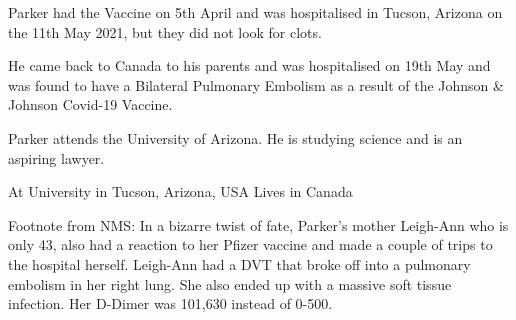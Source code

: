 Parker had the Vaccine on 5th April and was hospitalised in Tucson, Arizona on
the 11th May 2021, but they did not look for clots.

He came back to Canada to his parents and was hospitalised on 19th May and was
found to have a Bilateral Pulmonary Embolism as a result of the Johnson \&
Johnson Covid-19 Vaccine.

Parker attends the University of Arizona. He is studying science and is an
aspiring lawyer.

At University in Tucson, Arizona, USA Lives in Canada

Footnote from NMS: In a bizarre twist of fate, Parker’s mother Leigh-Ann who is
only 43, also had a reaction to her Pfizer vaccine and made a couple of trips to
the hospital herself. Leigh-Ann had a DVT that broke off into a pulmonary
embolism in her right lung. She also ended up with a massive soft tissue
infection. Her D-Dimer was 101,630 instead of 0-500.

